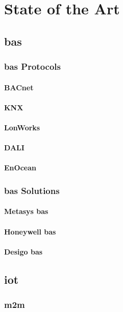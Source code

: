 \chapter{State of the Art}
\label{chapter:state_of_the_art}

\section{\acf{bas}}
\subsection{\ac{bas} Protocols}
\subsubsection{BACnet}
\subsubsection{KNX}
\subsubsection{LonWorks}
\subsubsection{DALI}
\subsubsection{EnOcean}
\subsection{\ac{bas} Solutions}
\subsubsection{Metasys \ac{bas}}
\subsubsection{Honeywell \ac{bas}}
\subsubsection{Desigo \ac{bas}}
\section{\acf{iot}}
\subsection{\acf{m2m}}
